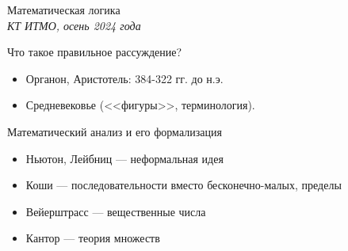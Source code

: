 \documentclass[aspectratio=169]{beamer}
\begin{document}
\newtheorem{axiom}{Аксиома}
\newtheorem{exmprus}{Пример}
\newtheorem{defrus}{Определение}
\newtheorem{lemmarus}{Лемма}
\newtheorem{thmrus}{Лемма}

\begin{frame}{}
\begin{center}{\Large Математическая логика}\\\itshape{КТ ИТМО, осень 2024 года}\end{center}
\end{frame}

\begin{frame}{Что такое правильное рассуждение?}
\begin{itemize}
\item Органон, Аристотель: 384-322 гг. до н.э.
\item Средневековье (<<фигуры>>, терминология).
\end{itemize}
\end{frame}

\begin{frame}{Математический анализ и его формализация}
\begin{itemize}
\item Ньютон, Лейбниц --- неформальная идея
\vspace{1cm}
\item Коши --- последовательности вместо бесконечно-малых, пределы
\vspace{1cm}
\item Вейерштрасс --- вещественные числа
\vspace{1cm}
\item Кантор --- теория множеств
\end{itemize}
\end{frame}

%
\end{document}
